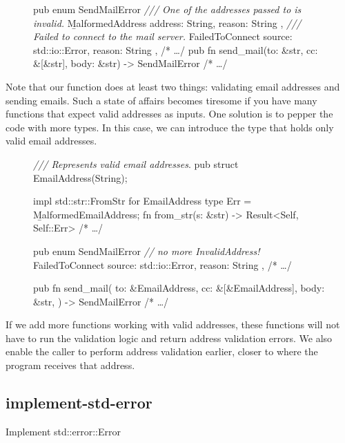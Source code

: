 \documentclass{article}
\begin{document}
\begin{figure}
\begin{code}[bad]
pub enum SendMailError {
  \emph{/// One of the addresses passed to  is invalid.}
  \b{MalformedAddress} { address: String, reason: String },
  \emph{/// Failed to connect to the mail server.}
  FailedToConnect { source: std::io::Error, reason: String },
  /* \ldots  */
}
pub fn send_mail(to: &str, cc: &[&str], body: &str) -> SendMailError { /* \ldots  */ }
\end{code}
\end{figure}

Note that our  function does at least two things: validating email addresses and sending emails.
Such a state of affairs becomes tiresome if you have many functions that expect valid addresses as inputs.
One solution is to pepper the code with more types.
In this case, we can introduce the  type that holds only valid email addresses.

\begin{figure}
\begin{code}[good]
\emph{/// Represents valid email addresses}.
pub struct EmailAddress(String);

impl std::str::FromStr for EmailAddress {
  type Err = \b{MalformedEmailAddress};
  fn from_str(s: &str) -> Result<Self, Self::Err> { /* \ldots  */ }
}

pub enum SendMailError {
  \emph{// no more InvalidAddress!}
  FailedToConnect { source: std::io::Error, reason: String },
  /* \ldots  */
}

pub fn send_mail(
    to: &EmailAddress,
    cc: &[&EmailAddress],
    body: &str,
) -> SendMailError { /* \ldots  */ }
\end{code}
\end{figure}

If we add more functions working with valid addresses, these functions will not have to run the validation logic and return address validation errors.
We also enable the caller to perform address validation earlier, closer to where the program receives that address.

\subsection{implement-std-error}{Implement std::error::Error}
\end{document}
